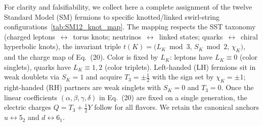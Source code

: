 \documentclass[smallextended]{svjour3}       %
\begin{document}
For clarity and falsifiability, we collect here a complete assignment of the twelve Standard Model (SM) fermions to specific knotted/linked swirl-string configurations~\ref{tab:SM12_knot_map}. The mapping respects the SST taxonomy (charged leptons \,$\leftrightarrow$\, torus knots; neutrinos \,$\leftrightarrow$\, linked states; quarks \,$\leftrightarrow$\, chiral hyperbolic knots), the invariant triple
\(t(K) = \big(L_K \bmod 3,\, S_K \bmod 2,\, \chi_K\big)\), and the charge map of Eq.~(20). Color is fixed by \(L_K\): leptons have \(L_K\equiv 0\) (color singlets), quarks have \(L_K\equiv 1,2\) (color triplets). Left-handed (LH) fermions sit in weak doublets via \(S_K=1\) and acquire \(T_3=\pm\tfrac12\) with the sign set by \(\chi_K=\pm 1\); right-handed (RH) partners are weak singlets with \(S_K=0\) and \(T_3=0\). Once the linear coefficients \((\alpha,\beta,\gamma,\delta)\) in Eq.~(20) are fixed on a single generation, the electric charges \(Q = T_3 + \tfrac12 Y\) follow for all flavors. We retain the canonical anchors \(u\leftrightarrow 5_2\) and \(d\leftrightarrow 6_1\).
\end{document}
